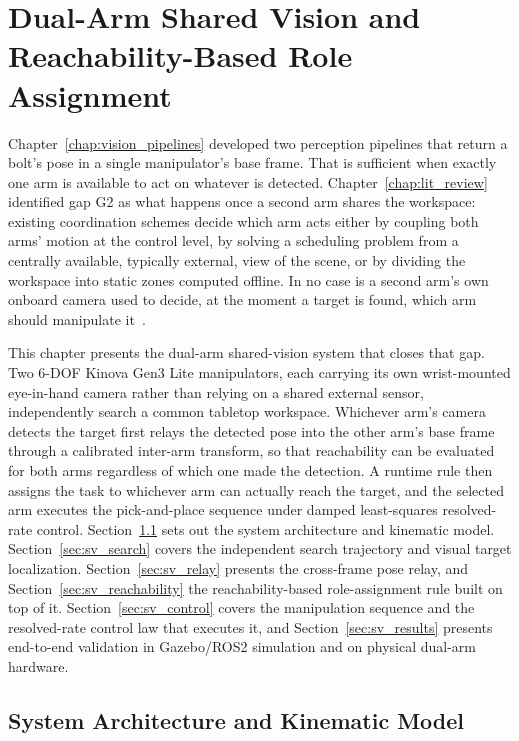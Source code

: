 \chapter{Dual-Arm Shared Vision and Reachability-Based Role Assignment}
\label{chap:shared_vision}

Chapter~\ref{chap:vision_pipelines} developed two perception pipelines that return a bolt's pose in
a single manipulator's base frame. That is sufficient when exactly one arm is available to act on
whatever is detected. Chapter~\ref{chap:lit_review} identified gap G2 as what happens once a second
arm shares the workspace: existing coordination schemes decide which arm acts either by coupling
both arms' motion at the control level, by solving a scheduling problem from a centrally available,
typically external, view of the scene, or by dividing the workspace into static zones computed
offline. In no case is a second arm's own onboard camera used to decide, at the moment a target is
found, which arm should manipulate it~\citep{sk2025sharedvision}.

This chapter presents the dual-arm shared-vision system that closes that gap. Two 6-DOF Kinova
Gen3 Lite manipulators, each carrying its own wrist-mounted eye-in-hand camera rather than relying
on a shared external sensor, independently search a common tabletop workspace. Whichever arm's
camera detects the target first relays the detected pose into the other arm's base frame through a
calibrated inter-arm transform, so that reachability can be evaluated for both arms regardless of
which one made the detection. A runtime rule then assigns the task to whichever arm can actually
reach the target, and the selected arm executes the pick-and-place sequence under damped
least-squares resolved-rate control. Section~\ref{sec:sv_architecture} sets out the system
architecture and kinematic model. Section~\ref{sec:sv_search} covers the independent search
trajectory and visual target localization. Section~\ref{sec:sv_relay} presents the cross-frame pose
relay, and Section~\ref{sec:sv_reachability} the reachability-based role-assignment rule built on
top of it. Section~\ref{sec:sv_control} covers the manipulation sequence and the resolved-rate
control law that executes it, and Section~\ref{sec:sv_results} presents end-to-end validation in
Gazebo/ROS2 simulation and on physical dual-arm hardware.

\section{System Architecture and Kinematic Model}\label{sec:sv_architecture}

